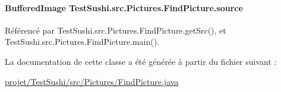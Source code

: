 \hypertarget{classTestSushi_1_1src_1_1Pictures_1_1FindPicture_a8f97c27187060e065669476a0774be89}{}
\paragraph[{source}]{\setlength{\rightskip}{0pt plus 5cm}Buffered\+Image Test\+Sushi.\+src.\+Pictures.\+Find\+Picture.\+source}\label{classTestSushi_1_1src_1_1Pictures_1_1FindPicture_a8f97c27187060e065669476a0774be89}


Référencé par Test\+Sushi.\+src.\+Pictures.\+Find\+Picture.\+get\+Src(), et Test\+Sushi.\+src.\+Pictures.\+Find\+Picture.\+main().



La documentation de cette classe a été générée à partir du fichier suivant \+:\begin{DoxyCompactItemize}
\item 
\hyperlink{projet_2TestSushi_2src_2Pictures_2FindPicture_8java}{projet/\+Test\+Sushi/src/\+Pictures/\+Find\+Picture.\+java}\end{DoxyCompactItemize}
